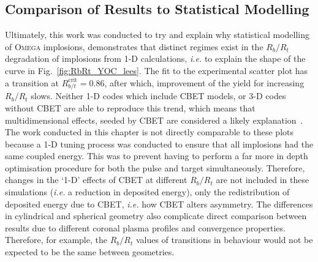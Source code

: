 \subsection{Comparison of Results to Statistical Modelling}%
\label{sec:Res1_Stat_Mod_Comp}

Ultimately, this work was conducted to try and explain why statistical modelling of \textsc{Omega} implosions, demonstrates that distinct regimes exist in the $R_b/R_t$ degradation of implosions from 1-D calculations, \textit{i.e.} to explain the shape of the curve in Fig.~\ref{fig:RbRt_YOC_lees}.
The fit to the experimental scatter plot has a transition at $R_{b/t}^{\text{crit}}=0.86$, after which, improvement of the yield for increasing $R_b/R_t$ slows.
Neither 1-D codes which include \ac{CBET} models, or 3-D codes without \ac{CBET} are able to reproduce this trend, which means that multidimensional effects, seeded by \ac{CBET} are considered a likely explanation~\cite{gopalaswamy_using_2021}.
The work conducted in this chapter is not directly comparable to these plots because a 1-D tuning process was conducted to ensure that all implosions had the same coupled energy.
This was to prevent having to perform a far more in depth optimisation procedure for both the pulse and target simultaneously.
Therefore, changes in the `1-D' effects of \ac{CBET} at different $R_b/R_t$ are not included in these simulations (\textit{i.e.} a reduction in deposited energy), only the redistribution of deposited energy due to \ac{CBET}, \textit{i.e.} how \ac{CBET} alters asymmetry.
The differences in cylindrical and spherical geometry also complicate direct comparison between results due to different coronal plasma profiles and convergence properties.
Therefore, for example, the $R_b/R_t$ values of transitions in behaviour would not be expected to be the same between geometries.

